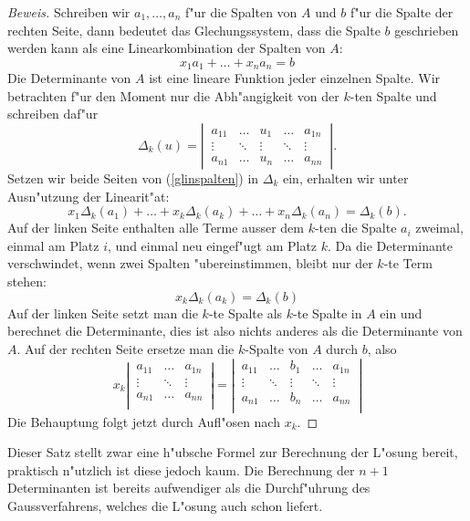 \begin{proof}[Beweis]
Schreiben wir $a_1,\dots,a_n$ f"ur die Spalten von $A$ und $b$ f"ur die 
Spalte der rechten Seite, dann bedeutet das Glechungssystem, dass die
Spalte $b$ geschrieben werden kann als eine Linearkombination der
Spalten von $A$:
\begin{equation}
x_1a_1+\dots +x_na_n=b
\label{glinspalten}
\end{equation}
Die Determinante von $A$ ist eine lineare Funktion jeder einzelnen Spalte.
Wir betrachten f"ur den Moment nur die Abh"angigkeit von der $k$-ten
Spalte und schreiben daf"ur
\[
\Delta_k(u)=\left|
\,\begin{matrix}
a_{11}&\dots&u_1&\dots&a_{1n}\\
\vdots&\ddots&\vdots&\ddots&\vdots\\
a_{n1}&\dots&u_n&\dots&a_{nn}
\end{matrix}
\,\right|.
\]
Setzen wir beide Seiten von (\ref{glinspalten}) in $\Delta_k$ ein,
erhalten wir unter Ausn"utzung der Linearit"at:
\[
x_1\Delta_k(a_1)+\dots+x_k\Delta_k(a_k)+\dots+x_n\Delta_k(a_n)=\Delta_k(b).
\]
Auf der linken Seite enthalten alle Terme ausser dem $k$-ten die
Spalte $a_i$ zweimal, einmal am Platz $i$, und einmal neu eingef"ugt am
Platz $k$. Da die Determinante verschwindet, wenn zwei Spalten "ubereinstimmen,
bleibt nur der $k$-te Term stehen:
\[
x_k\Delta_k(a_k)=\Delta_k(b)
\]
Auf der linken Seite setzt man die $k$-te Spalte als $k$-te Spalte
in $A$ ein und berechnet die Determinante, dies ist also nichts
anderes als die Determinante von $A$. Auf der rechten Seite ersetze man
die $k$-Spalte von $A$ durch $b$, also
\[
x_k
\left|\,\begin{matrix}
a_{11}&\dots&a_{1n}\\
\vdots&\ddots&\vdots\\
a_{n1}&\dots&a_{nn}\\
\end{matrix}\,\right|
=
\left|\,\begin{matrix}
a_{11}&\dots&b_1&\dots&a_{1n}\\
\vdots&\ddots&\vdots&\ddots&\vdots\\
a_{n1}&\dots&b_n&\dots&a_{nn}\\
\end{matrix}\,\right|
\]
Die Behauptung folgt jetzt durch Aufl"osen nach $x_k$.
\end{proof}
Dieser Satz stellt zwar eine h"ubsche Formel zur Berechnung der L"osung
bereit, praktisch n"utzlich ist diese jedoch kaum. Die Berechnung der
$n+1$ Determinanten ist bereits aufwendiger als die Durchf"uhrung des
Gaussverfahrens, welches die L"osung auch schon liefert.


